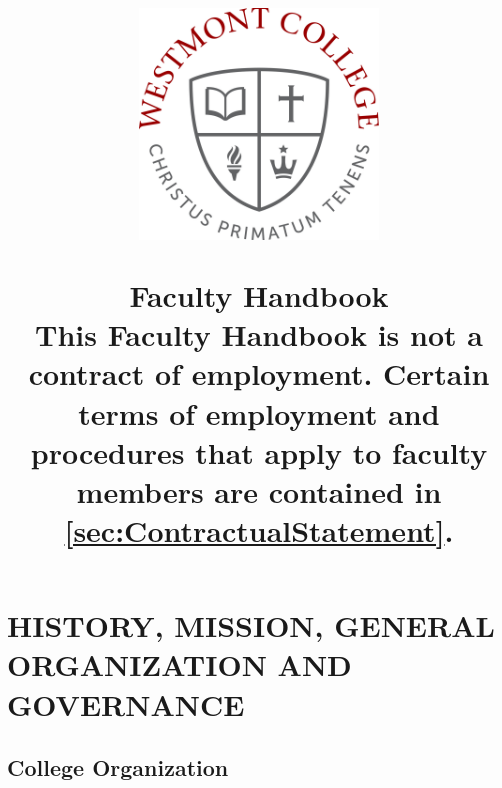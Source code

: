 \documentclass[letterpaper, 11pt]{article}
\date{}
\author{}
\title{
\begin{center}
\includegraphics[width=2.5in]{images/WestmontSeal.jpg}
\end{center}
\vspace{1in}
{\bfseries \Huge Faculty Handbook }\\
\vspace{1in}
This Faculty Handbook is not a contract of employment.  Certain terms of employment and procedures that apply to faculty members are contained in \autoref{sec:ContractualStatement}.
}
\begin{document}
\fancyhf{} %
\cfoot{\bf -- \thepage\ --}

\renewcommand{\contentsname}{Table of Contents}

\maketitle

\thispagestyle{empty}

\clearpage

\tableofcontents


\setcounter{page}{1}

\clearpage



\setcounter{page}{1} 

\section{HISTORY, MISSION, GENERAL ORGANIZATION AND GOVERNANCE}


\subsection{College Organization}
\end{document}
